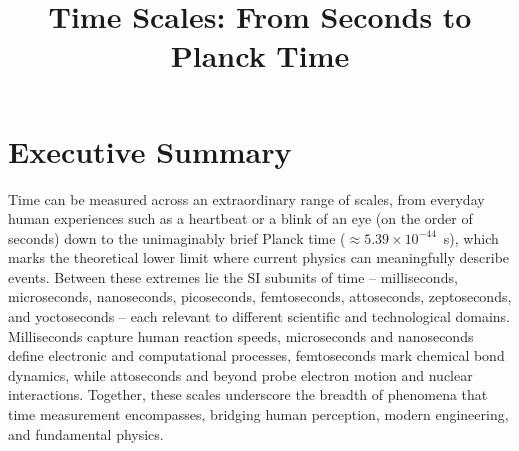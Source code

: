\documentclass[11pt]{article}
\title{Time Scales: From Seconds to Planck Time}
\author{}
\date{}
\begin{document}
\maketitle

\section*{Executive Summary}
Time can be measured across an extraordinary range of scales, from everyday
human experiences such as a heartbeat or a blink of an eye (on the order of
seconds) down to the unimaginably brief Planck time (\(\approx 5.39\times10^{-44}\)~s),
which marks the theoretical lower limit where current
physics can meaningfully describe events. Between these extremes lie the SI
subunits of time -- milliseconds, microseconds, nanoseconds, picoseconds,
femtoseconds, attoseconds, zeptoseconds, and yoctoseconds -- each relevant to
different scientific and technological domains. Milliseconds capture human
reaction speeds, microseconds and nanoseconds define electronic and
computational processes, femtoseconds mark chemical bond dynamics, while
attoseconds and beyond probe electron motion and nuclear interactions. Together,
these scales underscore the breadth of phenomena that time measurement
encompasses, bridging human perception, modern engineering, and fundamental
physics.
\end{document}
